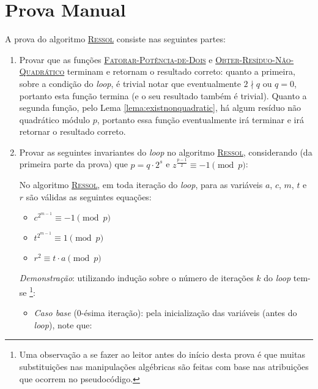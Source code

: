 \section{Prova Manual}
A prova do algoritmo \hyperref[algo:ressol]{\textsc{Ressol}} consiste nas seguintes partes:

\begin{enumerate}
    \item Provar que as funções \hyperref[algo:2factorizationmachine]{\textsc{Fatorar-Potência-de-Dois}} e \hyperref[algo:nonquadraticresidue]{\textsc{Obter-Resíduo-Não-Quadrático}} terminam e retornam o resultado correto: quanto a primeira, sobre a condição do \textit{loop}, é trivial notar que eventualmente $2 \nmid q$ ou $q = 0$, portanto esta função termina (e o seu resultado também é trivial). Quanto a segunda função, pelo Lema \ref{lema:existnonquadratic}, há algum resíduo não quadrático módulo $p$, portanto essa função eventualmente irá terminar e irá retornar o resultado correto.                                                                             
    \item \label{item:provaaux} Provar as seguintes invariantes do \textit{loop} no algoritmo \hyperref[algo:ressol]{\textsc{Ressol}}, considerando (da primeira parte da prova) que $p = q \cdot 2^s$ e $z^{\frac{p-1}{2}} \equiv -1 \pmod{p}$:
    \begin{lema}
        No algoritmo \hyperref[algo:ressol]{\textsc{Ressol}}, em toda iteração do \textit{loop}, para as variáveis $a$, $c$, $m$, $t$ e $r$ são válidas as seguintes equações:
    \end{lema}
    \begin{itemize}
        \item $c^{2^{m-1}} \equiv -1 \pmod{p}$
        \item $t^{2^{m-1}} \equiv 1 \pmod{p}$
        \item $r^2 \equiv t \cdot a \pmod{p}$
    \end{itemize}
    \textit{Demonstração}: utilizando indução sobre o número de iterações $k$ do \textit{loop} tem-se
    \footnote{Uma observação a se fazer ao leitor antes do início desta prova é que muitas substituições nas manipulações algébricas são feitas com base nas atribuições que ocorrem no pseudocódigo.}:
    \begin{itemize}
        \item \textit{Caso base} ($0$-ésima iteração): pela inicialização das variáveis (antes do \textit{loop}), note que:

\end{itemize}
\end{enumerate}
